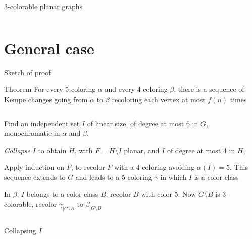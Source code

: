 \documentclass[11pt,xcolor=dvipsnames,presentation]{beamer}
\newcommand{\myorange}{DarkOrange2}
\begin{document}
\begin{frame}{3-colorable planar graphs}
\begin{columns}
\begin{column}{.6\textwidth}
    \end{column}
  \end{columns}
\end{frame}

\section{General case}
\begin{frame}{Sketch of proof}
  \begin{block}{Theorem}
    For every 5-coloring $\alpha$ and every 4-coloring $\beta$, there is a
    sequence of Kempe changes going from $\alpha$ to $\beta$ recoloring each
    vertex at most $f(n)$ times
  \end{block}

  \begin{columns}
    \begin{column}{.6\textwidth}
      \begin{description}[<+->][1.]
      \item[1.] Find an independent set $I$ of linear size, of degree at most 6 in
        $G$, monochromatic in $\alpha$ and $\beta$,
      \item[2.] \emph{Collapse} $I$ to obtain $H$, with $F = H \setminus I$ planar,
        and $I$ of degree at most 4 in $H$,
      \item[3.] Apply induction on $F$, to recolor $F$ with a 4-coloring avoiding
        $\alpha(I) = 5$. This sequence extends to $G$ and leads to a 5-coloring
        $\gamma$ in which $I$ is a color class
      \item[4.] In $\beta$, $I$ belongs to a color class $B$, recolor $B$ with color
        5. Now $G \setminus B$ is 3-colorable, recolor $\gamma_{|G \setminus B}$ to
        $\beta_{|G \setminus B}$
      \end{description}
    \end{column}
    \hfill
    \begin{column}{.4\textwidth}
   
    \end{column}
  \end{columns}
\end{frame}

\begin{frame}{Collapsing $I$}
  
\end{frame}
\end{document}
